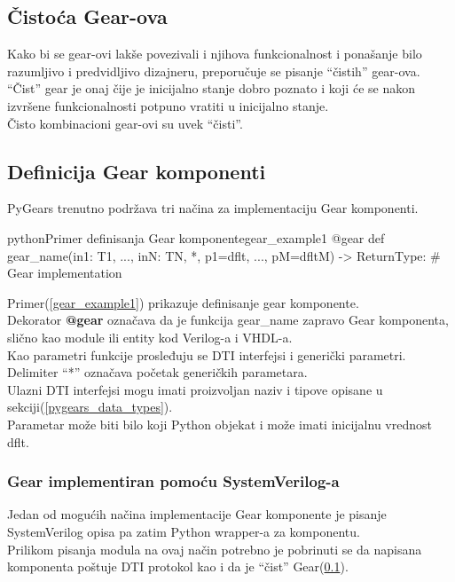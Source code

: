 \subsection{Čistoća Gear-ova} \label{gear_purity}

Kako bi se gear-ovi lakše povezivali i njihova funkcionalnost i ponašanje bilo
razumljivo i predvidljivo dizajneru, preporučuje se pisanje ``čistih''  gear-ova. \\
``Čist'' gear je onaj čije je inicijalno stanje dobro poznato i koji će se nakon
izvršene funkcionalnosti potpuno vratiti u inicijalno stanje. \\
Čisto kombinacioni gear-ovi su uvek ``čisti''.

\newpage
\subsection{Definicija Gear komponenti}

PyGears trenutno podržava tri načina za implementaciju Gear komponenti.

\begin{code}[H]{python}{Primer definisanja Gear komponente}{gear_example1}
@gear
def gear_name(in1: T1, ..., inN: TN,
              *,
              p1=dflt, ..., pM=dfltM) -> ReturnType:
    # Gear implementation
\end{code}

Primer(\ref{gear_example1}) prikazuje definisanje gear komponente. \\
Dekorator \textbf{@gear} označava da je funkcija gear\_name zapravo Gear komponenta,
slično kao module ili entity kod Verilog-a i VHDL-a. \\
Kao parametri funkcije prosleđuju se DTI interfejsi i generički parametri.
Delimiter ``*'' označava početak generičkih parametara. \\

Ulazni DTI interfejsi mogu imati proizvoljan naziv i tipove opisane u
sekciji(\ref{pygears_data_types}). \\
Parametar može biti bilo koji Python objekat i može imati inicijalnu vrednost dflt.

\subsubsection{Gear implementiran pomoću SystemVerilog-a}

Jedan od mogućih načina implementacije Gear komponente je pisanje SystemVerilog
opisa pa zatim Python wrapper-a za komponentu. \\
Prilikom pisanja modula na ovaj način potrebno je pobrinuti se da napisana
komponenta poštuje DTI protokol kao i da je ``čist'' Gear(\ref{gear_purity}). \\

